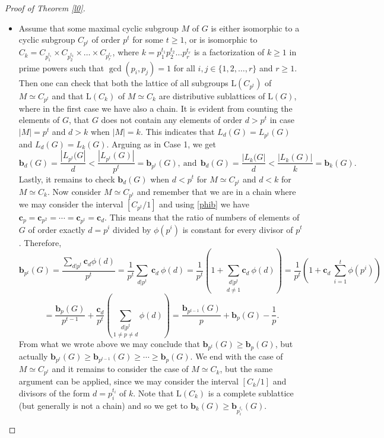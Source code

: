 \documentclass{amsart}
\theoremstyle{definition}
\numberwithin{equation}{section}
\begin{document}
\begin{proof}[Proof of Theorem \ref{l0}]
\begin{itemize}
 \item[Case 2.] Assume that  some maximal cyclic subgroup $M$ of $G$ is  either isomorphic to a cyclic subgroup $C_{p^t}$ of order $p^t$ for some $t \ge 1$, or  is isomorphic to $C_k =C_{p_1^{t_1}} \times  C_{p_2^{t_2}} \times \ldots \times C_{p_r^{t_r}}$, where  $k=p_1^{t_1} p_2^{t_2} \ldots p_r^{t_r}$ is a factorization of $k \ge 1$ in prime powers such that $\gcd(p_i, p_j)=1$ for all $i,j \in \{1, 2, \ldots, r\}$ and $r \ge 1$.   Then one can check that both the lattice of all subgroups $\mathrm{L}(C_{p^t})$ of $M \simeq C_{p^t}$  and that  $\mathrm{L}(C_{k})$  of $M \simeq C_k$ are distributive sublattices of $\mathrm{L}(G)$, where in the first case we have also a chain. It is  evident from counting the elements of $G$, that $G$ does not contain any elements of order $d > p^t$ in case $|M|=p^t$ and $d > k$ when $|M|=k$. This indicates that $L_d(G)=L_{p^t}(G)$ and  $L_{d}(G)= L_{k}(G). $ 
 Arguing as in Case 1, we get
\begin{equation} \mathbf{b}_d(G)=\frac{|L_{p^t}(G|}{d}<\frac{|L_{p^t}(G)|}{p^t}=\mathbf{b}_{p^t}(G),   \ \mbox{and}  \ \ 
\mathbf{b}_d(G)=\frac{|L_{k}(G|}{d}< \frac{|L_k(G)|}{k}=\mathbf{b}_{k}(G).
\end{equation} 
Lastly, it remains to check $\mathbf{b}_{d}(G)$ when
 $d < p^t$  for $M\simeq C_{p^t}$ and $d < k$ for $M\simeq C_{k}$.  Now consider $M\simeq C_{p^t}$ and remember that we are in a chain where we may consider  the interval $[C_{p^t}/1]$  and using \eqref{phib} we have $\mathbf{c}_p=\mathbf{c}_{p^2}=\cdots =\mathbf{c}_{p^t}=\mathbf{c}_d.$ This means that the ratio of numbers of elements of $G$  of order exactly  $d=p^i$ divided by  $\phi(p^i)$ is constant for every divisor  of $p^t$. Therefore, 
\begin{equation}
\mathbf{b}_{p^t}(G)=\frac{\underset{d | p^t}{\sum} \mathbf{c}_d \phi(d)}{p^t} = \frac{1}{p^t} \underset{d | p^t}{\sum}  \ \mathbf{c}_d  \ \phi(d) = \frac{1}{p^t} \left(1+\underset{d \neq 1} {\underset{d|p^t}{\sum}} \mathbf{c}_d  \ \phi(d)\right)= \frac{1}{p^t} \left(1+\mathbf{c}_d   \ {\overset{t}{\underset{i=1} \sum}} \phi(p^i)\right)\end{equation}  
\[= \frac{\mathbf{b}_{p}(G)}{p^{t-1}} + \frac{\mathbf{c}_d}{p^t} \left( \underset{1 \neq p\neq d} {\underset{d | p^t} \sum}  \phi(d) \right)=\frac{\mathbf{b}_{p^{t-1}}(G)}{p}+\mathbf{b}_p(G)-\frac{1}{p}.\]
From what we wrote above we may conclude that  $\mathbf{b}_{p^t}(G) \geq \mathbf{b}_{p}(G)$, but actually
$\mathbf{b}_{p^t}(G)\geq \mathbf{b}_{p^{t-1}}(G) \geq \cdots \geq\mathbf{b}_{p}(G).$ We end with the case of $M \simeq C_{p^t}$ and it remains to consider the case of $M \simeq C_k$, but the same argument can be applied, since we may consider the interval $[C_k/1]$ and divisors of the form $d=p_i^{t_i}$ of $k$. Note that  $\mathrm{L}(C_{k})$ is a complete sublattice (but generally is not a chain) and so we get to $\mathbf{b}_{k}(G) \geq \mathbf{b}_{p_i^{t_i}}(G).$ 

\end{itemize}
\end{proof}
\end{document}
